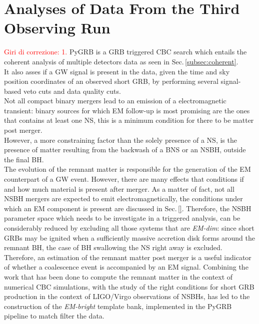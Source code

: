 \documentclass[binding=0.6cm, LaM]{sapthesis}
\newcommand{\fpg}[1]{\textcolor{red}{#1} }
\begin{document}
\chapter{Analyses of Data From the Third Observing Run}
\label{ch:datanalysis}
\fpg{Giri di correzione: 1.}%
        {\ttfamily PyGRB} is a GRB triggered CBC search
	which entails the coherent analysis of multiple detectors data as seen in Sec.\,\ref{subsec:coherent}. \\
	It also asses if a GW signal is present in the data, 
	given the time and sky position coordinates of an observed short GRB,
	by performing several signal-based veto cuts and data quality cuts. \\
	Not all compact binary mergers lead to an emission of a electromagnetic transient: 
	binary sources for which EM follow-up is most promising are the ones that contains at least one NS,
	this is a minimum condition for there to be matter post merger. \\
	However, a more constraining factor than the solely presence of a NS,
	is the presence of matter resulting from the backwash of a BNS or an NSBH,
	outside the final BH.  \\
	The evolution of the remnant matter is responsible for the generation of the EM counterpart of a GW event.
	However, there are many effects that conditions if and how much material is present after merger.
	As a matter of fact, not all NSBH mergers are expected to emit electromagnetically, 
	the conditions under which an EM component is present are discussed in Sec.\,\ref{}.
	Therefore, the NSBH parameter space which needs to be investigate in a triggered analysis,
	can be considerably reduced by excluding all those systems that are \textit{EM-dim}:
	since short GRBs may be ignited when a sufficiently massive accretion disk forms around the remnant BH,
	the case of BH swallowing the NS right away is excluded. \\
	Therefore, an estimation of the remnant matter post merger is a useful indicator of 
	whether a coalescence event is accompanied by an EM signal.  
	Combining the work that has been done to compute the remnant matter in the context of numerical CBC simulations,
	with the study of the right conditions for short GRB production in the context of LIGO/Virgo observations of NSBHs,
	has led to the construction of the \textit{EM-bright} template bank, implemented in the {\ttfamily PyGRB} pipeline to match filter the data. \\
\end{document}
